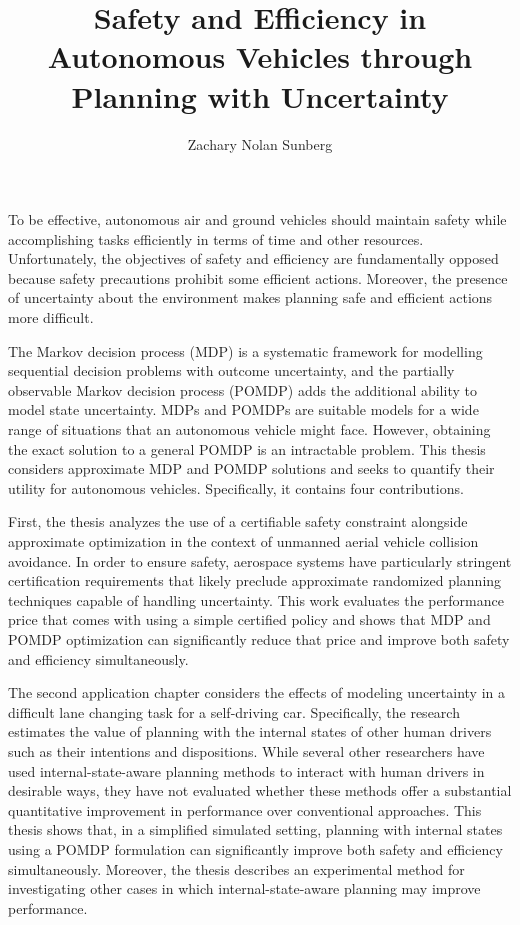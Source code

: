 \documentclass[12pt]{report}
\title{Safety and Efficiency in Autonomous Vehicles through Planning with Uncertainty}
\author{Zachary Nolan Sunberg}
\begin{document}
\beforepreface 


To be effective, autonomous air and ground vehicles should maintain safety while accomplishing tasks efficiently in terms of time and other resources.
Unfortunately, the objectives of safety and efficiency are fundamentally opposed because safety precautions prohibit some efficient actions.
Moreover, the presence of uncertainty about the environment makes planning safe and efficient actions more difficult.

The Markov decision process (MDP) is a systematic framework for modelling sequential decision problems with outcome uncertainty, and the partially observable Markov decision process (POMDP) adds the additional ability to model state uncertainty.
MDPs and POMDPs are suitable models for a wide range of situations that an autonomous vehicle might face.
However, obtaining the exact solution to a general POMDP is an intractable problem.
This thesis considers approximate MDP and POMDP solutions and seeks to quantify their utility for autonomous vehicles.
Specifically, it contains four contributions.

First, the thesis analyzes the use of a certifiable safety constraint alongside approximate optimization in the context of unmanned aerial vehicle collision avoidance.
In order to ensure safety, aerospace systems have particularly stringent certification requirements that likely preclude approximate randomized planning techniques capable of handling uncertainty.
This work evaluates the performance price that comes with using a simple certified policy and shows that MDP and POMDP optimization can significantly reduce that price and improve both safety and efficiency simultaneously.

The second application chapter considers the effects of modeling uncertainty in a difficult lane changing task for a self-driving car.
Specifically, the research estimates the value of planning with the internal states of other human drivers such as their intentions and dispositions.
While several other researchers have used internal-state-aware planning methods to interact with human drivers in desirable ways, they have not evaluated whether these methods offer a substantial quantitative improvement in performance over conventional approaches.
This thesis shows that, in a simplified simulated setting, planning with internal states using a POMDP formulation can significantly improve both safety and efficiency simultaneously.
Moreover, the thesis describes an experimental method for investigating other cases in which internal-state-aware planning may improve performance.
\end{document}
